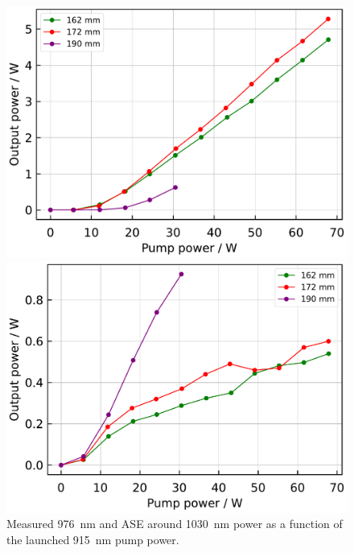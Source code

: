 \documentclass{osa-article}
\begin{document}
\begin{figure}[h!]
  \begin{minipage}[b]{0.5\linewidth}
    \centering
    \includegraphics[keepaspectratio, width=0.9\linewidth]{./Figure/DCF-YB-20-128P-FAC172mm_SignalComparisonByLength_915Pump976Seed0.24W_Exp}
    \subcaption{}
  \end{minipage}
  \begin{minipage}[b]{0.5\linewidth}
    \centering
    \includegraphics[keepaspectratio, width=0.9\linewidth]{./Figure/DCF-YB-20-128P-FAC172mm_ASEComparisonByLength_915Pump976Seed0.24W_Exp}
    \subcaption{}
  \end{minipage}
  \caption{Measured \SI{976}{nm} and ASE around \SI{1030}{nm} power as a function of the launched \SI{915}{nm} pump power.}
  \label{fig:OutputComparisonOfCORACTIVE976YDFA}
\end{figure}
\end{document}
